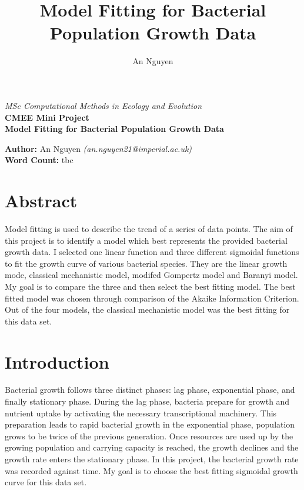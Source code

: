 \documentclass[11pt]{article}
\title{Model Fitting for Bacterial Population Growth Data}
\author{An Nguyen}
\begin{document}
\begin{titlepage}

        \centering
		\vspace*{2cm}
		\Large
		\emph{MSc Computational Methods in Ecology and Evolution}\\
		\vspace*{1cm}
		\Large
		\textbf{CMEE Mini Project}\\
		
		\vspace*{3cm}
		\Huge
		\textbf{Model Fitting for Bacterial Population Growth Data}\\
		
		\vspace{3cm}
		\Large
		
		\textbf{Author:} An Nguyen \textit{(an.nguyen21@imperial.ac.uk)}\\
		\vspace*{1cm}
		\textbf{Word Count:} tbc

	\end{titlepage}
\newpage
\tableofcontents
\newpage
{}
\section*{Abstract}
Model fitting is used to describe the trend of a series of data points.  The aim of this project is to identify a model which best represents the provided bacterial growth data. I selected one linear function and three different sigmoidal functions to fit the growth curve of various bacterial species. They are the linear growth mode, classical mechanistic model, modifed Gompertz model and Baranyi model. My goal is to compare the three and then select the best fitting model. The best fitted model was chosen through comparison of the Akaike Information Criterion. Out of the four models, the classical mechanistic model was the best fitting for this data set. 

\newpage
\section{Introduction}

Bacterial growth follows three distinct phases: lag phase, exponential phase, and finally stationary phase. During the lag phase, bacteria prepare for growth and nutrient uptake by activating the necessary transcriptional machinery. This preparation leads to rapid bacterial growth in the exponential phase, population grows to be twice of the previous generation. Once resources are used up by the growing population and carrying capacity is reached, the growth declines and the growth rate enters the stationary phase. In this project, the bacterial growth rate was recorded against time. My goal is to choose the best fitting sigmoidal growth curve for this data set. 
\end{document}
